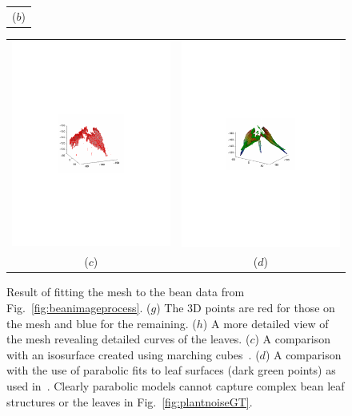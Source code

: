 \begin{figure}
\begin{center}
\begin{tabular}{c}
($b$) \\
\end{tabular}
\begin{tabular}{cc}
\includegraphics[trim=190 280 190 290,clip,width=0.49\linewidth]{Figures/bean3DIsosurface} &
\includegraphics[trim=190 280 190 290,clip,width=0.49\linewidth]{Figures/beanParabolic} \\
($c$) & ($d$) \\
\end{tabular}
\end{center}
   \caption{ Result of fitting the mesh to the bean data from Fig.~\ref{fig:beanimageprocess}.  ($g$)  The $3$D points are red for those on the mesh and blue for the remaining.  ($h$) A more detailed view of the mesh revealing detailed curves of the leaves. ($c$) A comparison with an isosurface created using marching cubes~\cite{Curless:1996}. ($d$) A comparison with the use of parabolic fits to leaf surfaces (dark green points) as used in~\cite{Alenya2011,Alenya2013}.  Clearly parabolic models cannot capture complex bean leaf structures or the leaves in Fig.~\ref{fig:plantnoiseGT}. }
\label{fig:beanfit}
\end{figure}

